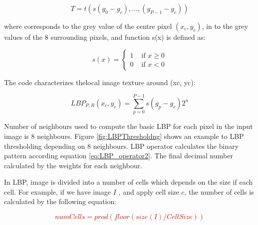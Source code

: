 \begin{equation}\label{eq:e joint_difference_distribution}
T = t(s(g_0 - g_c) , ... , (g_{P-1} - g_c))
\end{equation}

where  corresponds to the grey value of the centre pixel $(x_c, y_c)$, in to the grey values of the 8 surrounding pixels, and function s(x) is defined as:

\begin{equation}\label{eq:LBP_operator2}
s(x) = \left\{ \begin{array}{rl}
 1 &\mbox{ if $x \geq	0$} \\
  0 &\mbox{ if $x < 0$}
       \end{array} \right.
  \end{equation}

The code characterizes thelocal image texture around (xc, yc):


\begin{equation}\label{eq:LBP_operator3}
LBP_{P,R}(x_c, y_c) =\sum_{p=0}^{P-1}  s(g_p  - g_c)2^n
\end{equation}


 
Number of neighbours used to compute the basic LBP for each pixel in the input image is 8 neighbours. Figure \ref{fig:LBPThresholdng} shows an example to LBP thresholding depending on 8 neighbours. LBP operator calculates the binary pattern according equation \ref{eq:LBP_operator2}. The final decimal number calculated by the weights for each neighbour.

In LBP,  image is divided into a number of cells which depends on the size if each cell. For example, if we have  image $I$ ,  and apply cell size $c$, the number of cells is calculated by the following  equation:

\textcolor{red}{
\begin{equation}\label{eq:NoOfLBPCells}
numCells = prod(floor(size(I)/CellSize))
  \end{equation}
}


